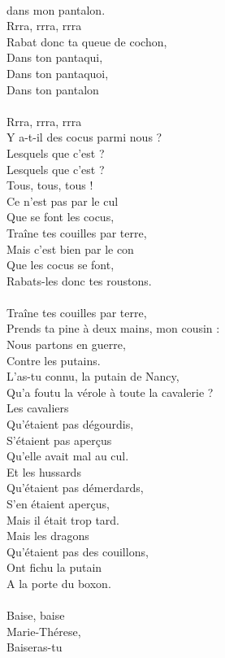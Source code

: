 \\dans mon pantalon.
\\Rrra, rrra, rrra 
\\Rabat donc ta queue de cochon,
\\Dans ton pantaqui, 
\\Dans ton pantaquoi, 
\\Dans ton pantalon 
\\\\Rrra, rrra, rrra 
\\Y a-t-il des cocus parmi nous ?
\\Lesquels que c'est ? 
\\Lesquels que c'est ?
\\Tous, tous, tous !
\\Ce n'est pas par le cul
\\Que se font les cocus,
\\Traîne tes couilles par terre,
\\Mais c'est bien par le con
\\Que les cocus se font,
\\Rabats-les donc tes roustons.
\\\\Traîne tes couilles par terre,
\\Prends ta pine à deux mains, mon cousin :
\\Nous partons en guerre,
\\Contre les putains.
\\L'as-tu connu, la putain de Nancy,
\\Qu'a foutu la vérole à toute la cavalerie ?
\\Les cavaliers 
\\Qu'étaient pas dégourdis,
\\S'étaient pas aperçus
\\Qu'elle avait mal au cul.
\\Et les hussards 
\\Qu'étaient pas démerdards,
\\S'en étaient aperçus, 
\\Mais il était trop tard.
\\Mais les dragons 
\\Qu'étaient pas des couillons,
\\Ont fichu la putain 
\\A la porte du boxon.
\\\\Baise, baise 
\\Marie-Thérese,
\\Baiseras-tu 
